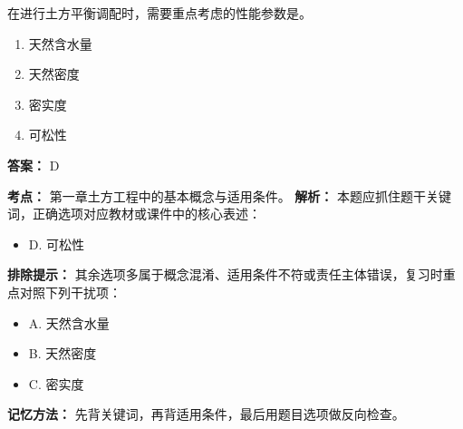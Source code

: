 \documentclass[UTF8,fontset=fandol,11pt]{ctexart}
\begin{document}
\begin{quizbox}[title={第 8 题}]
在进行土方平衡调配时，需要重点考虑的性能参数是。\\
\begin{enumerate}[label=\Alph*.]
\item 天然含水量
\item 天然密度
\item 密实度
\item 可松性
\end{enumerate}
\textbf{答案：} D
\vspace{0.25em}
\begin{answerbox}[title={考点解析}]
\textbf{考点：} 第一章土方工程中的基本概念与适用条件。
\textbf{解析：} 本题应抓住题干关键词，正确选项对应教材或课件中的核心表述：
\begin{itemize}
\item D. 可松性
\end{itemize}
\textbf{排除提示：} 其余选项多属于概念混淆、适用条件不符或责任主体错误，复习时重点对照下列干扰项：
\begin{itemize}
\item A. 天然含水量
\item B. 天然密度
\item C. 密实度
\end{itemize}
\textbf{记忆方法：} 先背关键词，再背适用条件，最后用题目选项做反向检查。
\end{answerbox}
\end{quizbox}
\end{document}

